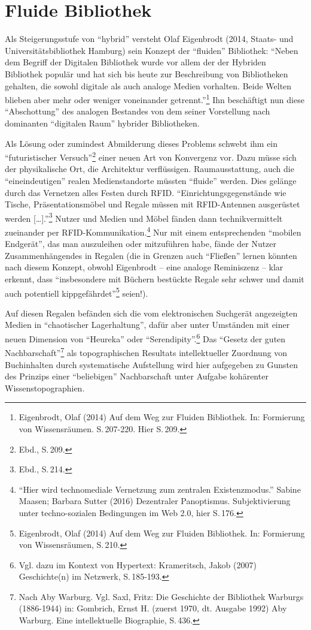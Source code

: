 \documentclass[a4paper,
fontsize=11pt,
oneside,
numbers=noperiodatend,
parskip=half-,
bibliography=totoc,
final
]{scrartcl}
\begin{document}
\section*{Fluide Bibliothek}\label{fluide-bibliothek}

Als Steigerungsstufe von \enquote{hybrid} versteht Olaf Eigenbrodt
(2014, Staats- und Universitätsbibliothek Hamburg) sein Konzept der
\enquote{fluiden} Bibliothek: \enquote{Neben dem Begriff der Digitalen
Bibliothek wurde vor allem der der Hybriden Bibliothek populär und hat
sich bis heute zur Beschreibung von Bibliotheken gehalten, die sowohl
digitale als auch analoge Medien vorhalten. Beide Welten blieben aber
mehr oder weniger voneinander getrennt.}\footnote{Eigenbrodt, Olaf
  (2014) Auf dem Weg zur Fluiden Bibliothek. In: Formierung von
  Wissensräumen. S.\,207-220. Hier S.\,209.} Ihn beschäftigt nun diese
\enquote{Abschottung} des analogen Bestandes von dem seiner Vorstellung
nach dominanten \enquote{digitalen Raum} hybrider Bibliotheken.

Als Lösung oder zumindest Abmilderung dieses Problems schwebt ihm ein
\enquote{futuristischer Versuch}\footnote{Ebd., S.\,209.} einer neuen Art
von Konvergenz vor. Dazu müsse sich der physikalische Ort, die
Architektur verflüssigen. Raumausstattung, auch die
\enquote{eineindeutigen} realen Medienstandorte müssten \enquote{fluide}
werden. Dies gelänge durch das Vernetzen alles Festen durch RFID.
\enquote{Einrichtungsgegenstände wie Tische, Präsentationsmöbel und
Regale müssen mit RFID-Antennen ausgerüstet werden
{[}\ldots{}{]}.}\footnote{Ebd., S.\,214.} Nutzer und Medien und Möbel
fänden dann technikvermittelt zueinander per
RFID-Kommunikation.\footnote{\enquote{Hier wird technomediale Vernetzung
  zum zentralen Existenzmodus.} Sabine Maasen; Barbara Sutter (2016)
  Dezentraler Panoptismus. Subjektivierung unter techno-sozialen
  Bedingungen im Web 2.0, hier S.\,176.} Nur mit einem entsprechenden
\enquote{mobilen Endgerät}, das man auszuleihen oder mitzuführen habe,
fände der Nutzer Zusammenhängendes in Regalen (die in Grenzen auch
\enquote{Fließen} lernen könnten nach diesem Konzept, obwohl Eigenbrodt
-- eine analoge Reminiszenz -- klar erkennt, dass \enquote{insbesondere
mit Büchern bestückte Regale sehr schwer und damit auch potentiell
kippgefährdet}\footnote{Eigenbrodt, Olaf (2014) Auf dem Weg zur Fluiden
  Bibliothek. In: Formierung von Wissensräumen, S.\,210.} seien!).

Auf diesen Regalen befänden sich die vom elektronischen Suchgerät
angezeigten Medien in \enquote{chaotischer Lagerhaltung}, dafür aber
unter Umständen mit einer neuen Dimension von \enquote{Heureka} oder
\enquote{Serendipity}.\footnote{Vgl. dazu im Kontext von Hypertext:
  Krameritsch, Jakob (2007) Geschichte(n) im Netzwerk, S.\,185-193.} Das
\enquote{Gesetz der guten Nachbarschaft}\footnote{Nach Aby Warburg. Vgl.
  Saxl, Fritz: Die Geschichte der Bibliothek Warburgs (1886-1944) in:
  Gombrich, Ernst H. (zuerst 1970, dt. Ausgabe 1992) Aby Warburg. Eine
  intellektuelle Biographie, S.\,436.} als topographischen Resultats
intellektueller Zuordnung von Buchinhalten durch systematische
Aufstellung wird hier aufgegeben zu Gunsten des Prinzips einer
\enquote{beliebigen} Nachbarschaft unter Aufgabe kohärenter
Wissenstopographien.
\end{document}
